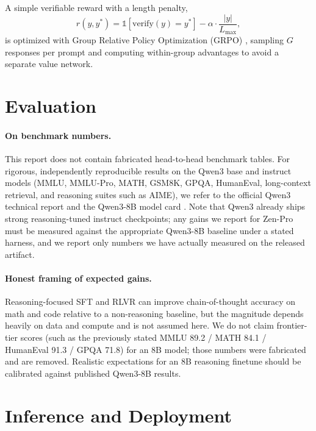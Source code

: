 \documentclass[11pt,a4paper]{article}
\begin{document}
A simple verifiable reward with a length penalty,
\begin{equation}
  r(y, y^*) = \mathbb{1}[\text{verify}(y) = y^*] - \alpha \cdot \frac{|y|}{L_{\max}},
\end{equation}
is optimized with Group Relative Policy Optimization (GRPO) \cite{shao2024deepseekmath}, sampling
$G$ responses per prompt and computing within-group advantages to avoid a separate value network.

\section{Evaluation}

\paragraph{On benchmark numbers.} This report does not contain fabricated head-to-head benchmark
tables. For rigorous, independently reproducible results on the Qwen3 base and instruct models
(MMLU, MMLU-Pro, MATH, GSM8K, GPQA, HumanEval, long-context retrieval, and reasoning suites such as
AIME), we refer to the official Qwen3 technical report \cite{qwen3report} and the Qwen3-8B model
card \cite{qwen3hf}. Note that Qwen3 already ships strong reasoning-tuned instruct checkpoints; any
gains we report for Zen-Pro must be measured against the appropriate Qwen3-8B baseline under a
stated harness, and we report only numbers we have actually measured on the released artifact.

\paragraph{Honest framing of expected gains.} Reasoning-focused SFT and RLVR can improve
chain-of-thought accuracy on math and code relative to a non-reasoning baseline, but the magnitude
depends heavily on data and compute and is not assumed here. We do not claim frontier-tier scores
(such as the previously stated MMLU 89.2 / MATH 84.1 / HumanEval 91.3 / GPQA 71.8) for an 8B
model; those numbers were fabricated and are removed. Realistic expectations for an 8B reasoning
finetune should be calibrated against published Qwen3-8B results.

\section{Inference and Deployment}
\end{document}

